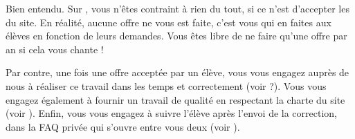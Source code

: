 ﻿Bien entendu. Sur \eDevoir, vous n'êtes contraint à rien du tout, si ce n'est d'accepter les  du site. En réalité, aucune offre ne vous est faite, c'est vous qui en faites aux élèves en fonction de leurs demandes. Vous êtes libre de ne faire qu'une offre par an si cela vous chante !

Par contre, une fois une offre acceptée par un élève, vous vous engagez auprès de nous à réaliser ce travail dans les temps et correctement (voir  ?). Vous vous engagez également à fournir un travail de qualité en respectant la charte du site (voir ). Enfin, vous vous engagez à suivre l'élève après l'envoi de la correction, dans la FAQ privée qui s'ouvre entre vous deux (voir ).